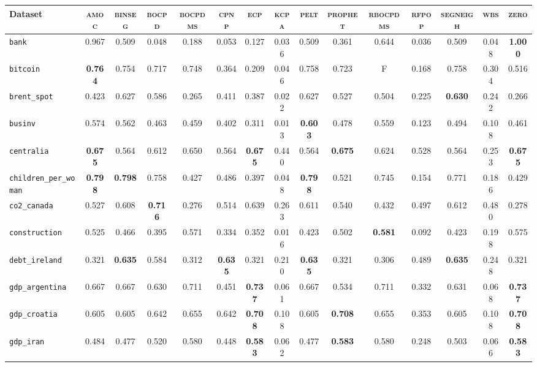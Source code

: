 \begin{tabular}{lcccccccccccccc}
Dataset & \textsc{amoc} & \textsc{binseg} & \textsc{bocpd} & \textsc{bocpdms} & \textsc{cpnp} & \textsc{ecp} & \textsc{kcpa} & \textsc{pelt} & \textsc{prophet} & \textsc{rbocpdms} & \textsc{rfpop} & \textsc{segneigh} & \textsc{wbs} & \textsc{zero}\\
\hline
\verb+bank+ & 0.967 & 0.509 & 0.048 & 0.188 & 0.053 & 0.127 & 0.036 & 0.509 & 0.361 & 0.644 & 0.036 & 0.509 & 0.048 & \textbf{1.000}\\
\verb+bitcoin+ & \textbf{0.764} & 0.754 & 0.717 & 0.748 & 0.364 & 0.209 & 0.046 & 0.758 & 0.723 & F & 0.168 & 0.758 & 0.304 & 0.516\\
\verb+brent_spot+ & 0.423 & 0.627 & 0.586 & 0.265 & 0.411 & 0.387 & 0.022 & 0.627 & 0.527 & 0.504 & 0.225 & \textbf{0.630} & 0.242 & 0.266\\
\verb+businv+ & 0.574 & 0.562 & 0.463 & 0.459 & 0.402 & 0.311 & 0.013 & \textbf{0.603} & 0.478 & 0.559 & 0.123 & 0.494 & 0.108 & 0.461\\
\verb+centralia+ & \textbf{0.675} & 0.564 & 0.612 & 0.650 & 0.564 & \textbf{0.675} & 0.440 & 0.564 & \textbf{0.675} & 0.624 & 0.528 & 0.564 & 0.253 & \textbf{0.675}\\
\verb+children_per_woman+ & \textbf{0.798} & \textbf{0.798} & 0.758 & 0.427 & 0.486 & 0.397 & 0.048 & \textbf{0.798} & 0.521 & 0.745 & 0.154 & 0.771 & 0.186 & 0.429\\
\verb+co2_canada+ & 0.527 & 0.608 & \textbf{0.716} & 0.276 & 0.514 & 0.639 & 0.263 & 0.611 & 0.540 & 0.432 & 0.497 & 0.612 & 0.480 & 0.278\\
\verb+construction+ & 0.525 & 0.466 & 0.395 & 0.571 & 0.334 & 0.352 & 0.016 & 0.423 & 0.502 & \textbf{0.581} & 0.092 & 0.423 & 0.198 & 0.575\\
\verb+debt_ireland+ & 0.321 & \textbf{0.635} & 0.584 & 0.312 & \textbf{0.635} & 0.321 & 0.210 & \textbf{0.635} & 0.321 & 0.306 & 0.489 & \textbf{0.635} & 0.248 & 0.321\\
\verb+gdp_argentina+ & 0.667 & 0.667 & 0.630 & 0.711 & 0.451 & \textbf{0.737} & 0.061 & 0.667 & 0.534 & 0.711 & 0.332 & 0.631 & 0.068 & \textbf{0.737}\\
\verb+gdp_croatia+ & 0.605 & 0.605 & 0.642 & 0.655 & 0.642 & \textbf{0.708} & 0.108 & 0.605 & \textbf{0.708} & 0.655 & 0.353 & 0.605 & 0.108 & \textbf{0.708}\\
\verb+gdp_iran+ & 0.484 & 0.477 & 0.520 & 0.580 & 0.448 & \textbf{0.583} & 0.062 & 0.477 & \textbf{0.583} & 0.580 & 0.248 & 0.503 & 0.066 & \textbf{0.583}\\

\end{tabular}
